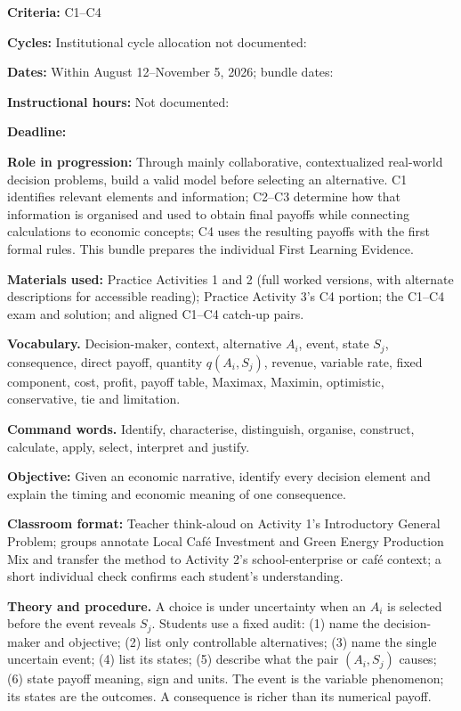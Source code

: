\documentclass[10pt,letterpaper]{article}
\newcommand{\labelled}[2]{\textbf{#1:} #2\par}
\newcommand{\plansection}[1]{\Needspace{8\baselineskip}\par\vspace{8pt}{\large\bfseries #1\par}\vspace{3pt}}
\newcommand{\plansubsection}[1]{\Needspace{7\baselineskip}\par\vspace{5pt}{\normalsize\bfseries #1\par}\vspace{1pt}}
\newcommand{\partheading}[1]{\Needspace{7\baselineskip}\par\vspace{4pt}{\bfseries #1\par}}
\begin{document}
\plansection{5. Experience: Three Pedagogical Actions}

\plansubsection{Pedagogical Action N1---From Decision Contexts to Payoff Tables and Decisions Without Probabilities}

\labelled{Criteria}{C1--C4}
\labelled{Cycles}{Institutional cycle allocation not documented: \underline{\hspace{2.2in}}}
\labelled{Dates}{Within August 12--November 5, 2026; bundle dates: \underline{\hspace{2.1in}}}
\labelled{Instructional hours}{Not documented: \underline{\hspace{1.6in}}}
\labelled{Deadline}{\underline{\hspace{3in}}}
\labelled{Role in progression}{Through mainly collaborative, contextualized real-world decision problems, build a valid model before selecting an alternative. C1 identifies relevant elements and information; C2--C3 determine how that information is organised and used to obtain final payoffs while connecting calculations to economic concepts; C4 uses the resulting payoffs with the first formal rules. This bundle prepares the individual First Learning Evidence.}
\labelled{Materials used}{Practice Activities 1 and 2 (full worked versions, with alternate descriptions for accessible reading); Practice Activity 3's C4 portion; the C1--C4 exam and solution; and aligned C1--C4 catch-up pairs.}

\textbf{Vocabulary.} Decision-maker, context, alternative $A_i$, event, state
$S_j$, consequence, direct payoff, quantity $q(A_i,S_j)$, revenue, variable
rate, fixed component, cost, profit, payoff table, Maximax, Maximin, optimistic,
conservative, tie and limitation.

\textbf{Command words.} Identify, characterise, distinguish, organise,
construct, calculate, apply, select, interpret and justify.

\partheading{Part 1---C1: Interpret the Anatomy of a Decision}
\labelled{Objective}{Given an economic narrative, identify every decision element and explain the timing and economic meaning of one consequence.}
\labelled{Classroom format}{Teacher think-aloud on Activity 1's Introductory General Problem; groups annotate Local Caf\'e Investment and Green Energy Production Mix and transfer the method to Activity 2's school-enterprise or caf\'e context; a short individual check confirms each student's understanding.}
\textbf{Theory and procedure.} A choice is under uncertainty when an $A_i$ is
selected before the event reveals $S_j$. Students use a fixed audit: (1) name
the decision-maker and objective; (2) list only controllable alternatives;
(3) name the single uncertain event; (4) list its states; (5) describe what the
pair $(A_i,S_j)$ causes; (6) state payoff meaning, sign and units. The event is
the variable phenomenon; its states are the outcomes. A consequence is richer
than its numerical payoff.
\end{document}
